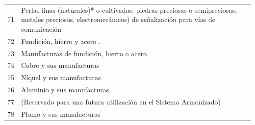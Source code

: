 \documentclass[a4paper,openright,12pt]{book}
\begin{document}
\begin{table}[]
{\begin{tabular}{@{}ll@{}}
71  & Perlas finas (naturales)* o cultivadas, piedras preciosas o semipreciosas, metales preciosos, electromecánicos) de señalización para vías de comunicación                                                                                                                                      \\
72  & Fundición, hierro y acero .                                                                                                                                                                                                                                                                    \\
73  & Manufacturas de fundición, hierro o acero                                                                                                                                                                                                                                                      \\
74  & Cobre y sus manufacturas                                                                                                                                                                                                                                                                       \\
75  & Níquel y sus manufacturas                                                                                                                                                                                                                                                                      \\
76  & Aluminio y sus manufacturas                                                                                                                                                                                                                                                                    \\
77  & (Reservado para una futura utilización en el Sistema Armonizado)                                                                                                                                                                                                                               \\
78  & Plomo y sus manufacturas                                                                                                                                                                                                                                                                       \\

\end{tabular}}
\end{table}
\end{document}
